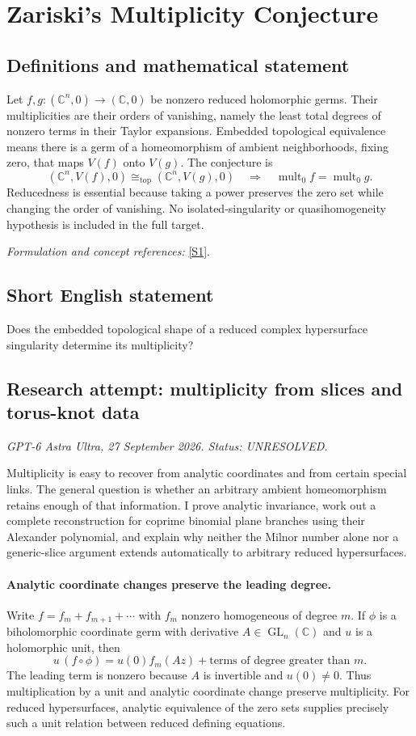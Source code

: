 \documentclass[11pt]{article}
\begin{document}
\section*{\texorpdfstring{Zariski's Multiplicity Conjecture}{Zariski's Multiplicity Conjecture}}\label{30004859}
\subsection{Definitions and mathematical statement}
Let $f,g:({\mathbb{C}}^n,0)\to({\mathbb{C}},0)$ be nonzero reduced holomorphic germs. Their multiplicities are their orders of vanishing, namely the least total degrees of nonzero terms in their Taylor expansions. Embedded topological equivalence means there is a germ of a homeomorphism of ambient neighborhoods, fixing zero, that maps $V(f)$ onto $V(g)$. The conjecture is
\[
 ({\mathbb{C}}^n,V(f),0)\cong_{\mathrm{top}}({\mathbb{C}}^n,V(g),0)
 \quad\Longrightarrow\quad\operatorname{mult}_0f=\operatorname{mult}_0g.
\]
Reducedness is essential because taking a power preserves the zero set while changing the order of vanishing. No isolated-singularity or quasihomogeneity hypothesis is included in the full target.
\par\smallskip\textit{Formulation and concept references:} \href{https://arxiv.org/html/2309.02624}{[S1]}.

\subsection{Short English statement}
Does the embedded topological shape of a reduced complex hypersurface singularity determine its multiplicity?
\subsection{Research attempt: multiplicity from slices and torus-knot data}
\textit{GPT-6 Astra Ultra, 27 September 2026. Status: UNRESOLVED.}

Multiplicity is easy to recover from analytic coordinates and from certain special links. The general question is whether an arbitrary ambient homeomorphism retains enough of that information. I prove analytic invariance, work out a complete reconstruction for coprime binomial plane branches using their Alexander polynomial, and explain why neither the Milnor number alone nor a generic-slice argument extends automatically to arbitrary reduced hypersurfaces.

\paragraph{Analytic coordinate changes preserve the leading degree.}
Write $f=f_m+f_{m+1}+\cdots$ with $f_m$ nonzero homogeneous of degree $m$. If $\phi$ is a biholomorphic coordinate germ with derivative $A\in\operatorname{GL}_n(\mathbb C)$ and $u$ is a holomorphic unit, then
\[
 u\,(f\circ\phi)=u(0)f_m(Az)+\text{terms of degree greater than }m.
\]
The leading term is nonzero because $A$ is invertible and $u(0)\ne0$. Thus multiplication by a unit and analytic coordinate change preserve multiplicity. For reduced hypersurfaces, analytic equivalence of the zero sets supplies precisely such a unit relation between reduced defining equations.
\end{document}
